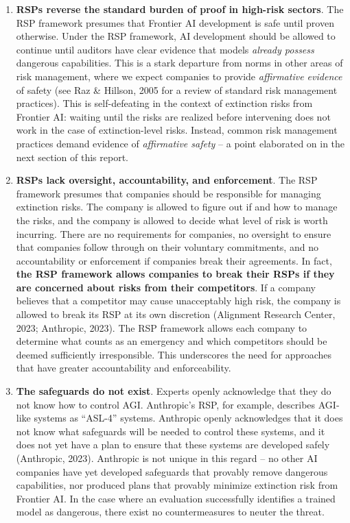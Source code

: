 \documentclass[12pt,a4paper]{article}
\begin{document}
\begin{enumerate}
\item \textbf{RSPs reverse the standard burden of proof in high-risk sectors}. The RSP framework presumes that Frontier AI development is safe until proven otherwise. Under the RSP framework, AI development should be allowed to continue until auditors have clear evidence that models \textit{already possess} dangerous capabilities. This is a stark departure from norms in other areas of risk management, where we expect companies to provide \textit{affirmative evidence }of safety (see Raz \& Hillson, 2005 for a review of standard risk management practices). This is self-defeating in the context of extinction risks from Frontier AI: waiting until the risks are realized before intervening does not work in the case of extinction-level risks. Instead, common risk management practices demand evidence of \textit{affirmative safety} – a point elaborated on in the next section of this report. 
\item \textbf{RSPs lack oversight, accountability, and enforcement}. The RSP framework presumes that companies should be responsible for managing extinction risks. The company is allowed to figure out if and how to manage the risks, and the company is allowed to decide what level of risk is worth incurring. There are no requirements for companies, no oversight to ensure that companies follow through on their voluntary commitments, and no accountability or enforcement if companies break their agreements. In fact, \textbf{the RSP framework allows companies to break their RSPs if they are concerned about risks from their competitors}. If a company believes that a competitor may cause unacceptably high risk, the company is allowed to break its RSP at its own discretion (Alignment Research Center, 2023; Anthropic, 2023). The RSP framework allows each company to determine what counts as an emergency and which competitors should be deemed sufficiently irresponsible. This underscores the need for approaches that have greater accountability and enforceability. 
\item \textbf{The safeguards do not exist}. Experts openly acknowledge that they do not know how to control AGI. Anthropic’s RSP, for example, describes AGI-like systems as “ASL-4” systems. Anthropic openly acknowledges that it does not know what safeguards will be needed to control these systems, and it does not yet have a plan to ensure that these systems are developed safely (Anthropic, 2023). Anthropic is not unique in this regard – no other AI companies have yet developed safeguards that provably remove dangerous capabilities, nor produced plans that provably minimize extinction risk from Frontier AI. In the case where an evaluation successfully identifies a trained model as dangerous, there exist no countermeasures to neuter the threat. 

\end{enumerate}
\end{document}
